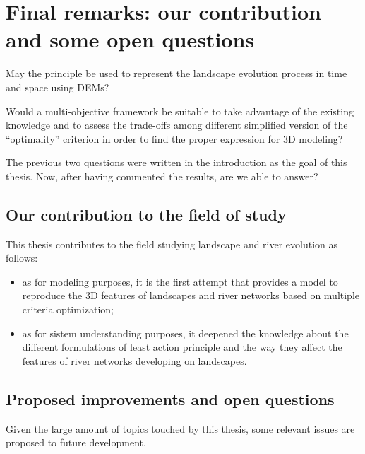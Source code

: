 \chapter{Final remarks: our contribution and some open questions}
\label{chap:conclusion}

May the principle be used to represent the landscape evolution
process in time and space using \aclp{DEM}?
\bigskip

Would a multi-objective framework be suitable to take 
advantage of the existing knowledge and to assess the trade-offs 
among different simplified version of the \enquote{optimality} 
criterion in order to find the proper expression for 3D modeling?
\bigskip

The previous two questions were written in the introduction as the
goal of this thesis. Now, after having commented the results, are
we able to answer?

\section{Our contribution to the field of study}
This thesis contributes to the field studying landscape and river
evolution as follows:
\begin{itemize}
  \item as for modeling purposes, it is the first attempt that
  provides a model to reproduce the 3D features of landscapes and
  river networks based on multiple criteria optimization;
  \item as for sistem understanding purposes, it deepened the
  knowledge about the different formulations of least action
  principle and the way they affect the features of river networks
  developing on landscapes.
\end{itemize}

\section{Proposed improvements and open questions}
Given the large amount of topics touched by this thesis, some
relevant issues are proposed to future development.
